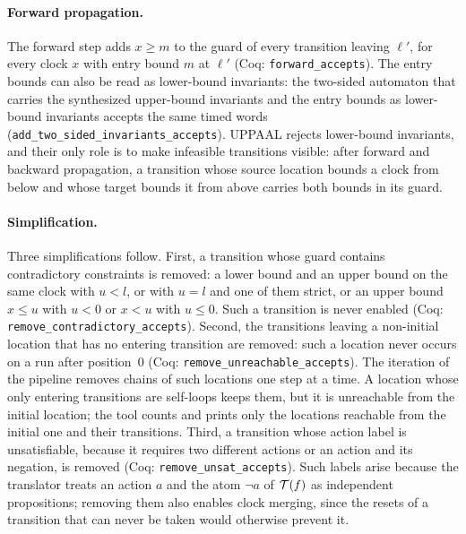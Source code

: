 \paragraph{Forward propagation.}
The forward step adds $x\ge m$ to the guard of every transition leaving
$\ell'$, for every clock $x$ with entry bound $m$ at $\ell'$ (Coq:
\texttt{forward\_\allowbreak{}accepts}).  The entry bounds can also be read as lower-bound
invariants: the two-sided automaton that carries the synthesized upper-bound
invariants and the entry bounds as lower-bound invariants accepts the same
timed words (\texttt{add\_\allowbreak{}two\_\allowbreak{}sided\_\allowbreak{}invariants\_\allowbreak{}accepts}).  UPPAAL
rejects lower-bound invariants, and their only role is to make infeasible
transitions visible: after forward and backward propagation, a transition whose
source location bounds a clock from below and whose target bounds it from above
carries both bounds in its guard.

\paragraph{Simplification.}
Three simplifications follow.  First, a transition whose guard contains
contradictory constraints is removed: a lower bound and an upper bound on the
same clock with $u<l$, or with $u=l$ and one of them strict, or an upper bound
$x\le u$ with $u<0$ or $x<u$ with $u\le0$.  Such a transition is never enabled (Coq:
\texttt{remove\_\allowbreak{}contradictory\_\allowbreak{}accepts}).  Second, the transitions
leaving a non-initial location that has no entering transition
are removed: such a location never occurs on a run after position~$0$ (Coq:
\texttt{remove\_\allowbreak{}unreachable\_\allowbreak{}accepts}).  The iteration of the pipeline
removes chains of such locations one step at a time.  A location whose only
entering transitions are self-loops keeps them, but it is unreachable from
the initial location; the tool counts and prints only the locations
reachable from the initial one and their transitions.  Third, a transition whose
action label is unsatisfiable, because it requires two different actions or an
action and its negation, is removed (Coq:
\texttt{remove\_\allowbreak{}unsat\_\allowbreak{}accepts}).  Such labels arise because the
translator treats an action $a$ and the atom $\neg a$ of $\mathcal{T}(f)$ as independent
propositions; removing them also enables clock merging, since the resets of a
transition that can never be taken would otherwise prevent it.

